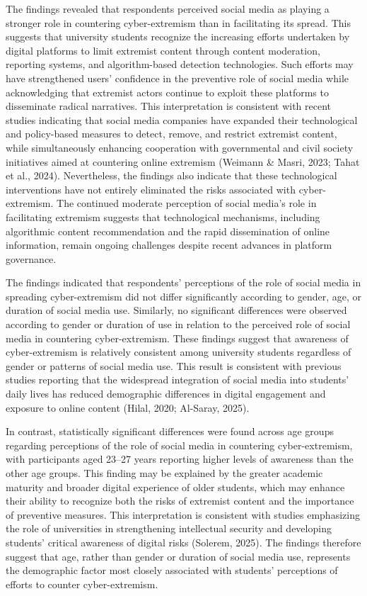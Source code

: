 \documentclass[10pt]{NSP1}
\begin{document}
	The findings revealed that respondents perceived social media as playing a stronger role in countering cyber-extremism than in facilitating its spread. This suggests that university students recognize the increasing efforts undertaken by digital platforms to limit extremist content through content moderation, reporting systems, and algorithm-based detection technologies. Such efforts may have strengthened users' confidence in the preventive role of social media while acknowledging that extremist actors continue to exploit these platforms to disseminate radical narratives. This interpretation is consistent with recent studies indicating that social media companies have expanded their technological and policy-based measures to detect, remove, and restrict extremist content, while simultaneously enhancing cooperation with governmental and civil society initiatives aimed at countering online extremism (Weimann \& Masri, 2023; Tahat et al., 2024). Nevertheless, the findings also indicate that these technological interventions have not entirely eliminated the risks associated with cyber-extremism. The continued moderate perception of social media's role in facilitating extremism suggests that technological mechanisms, including algorithmic content recommendation and the rapid dissemination of online information, remain ongoing challenges despite recent advances in platform governance.
	
	The findings indicated that respondents' perceptions of the role of social media in spreading cyber-extremism did not differ significantly according to gender, age, or duration of social media use. Similarly, no significant differences were observed according to gender or duration of use in relation to the perceived role of social media in countering cyber-extremism. These findings suggest that awareness of cyber-extremism is relatively consistent among university students regardless of gender or patterns of social media use. This result is consistent with previous studies reporting that the widespread integration of social media into students' daily lives has reduced demographic differences in digital engagement and exposure to online content (Hilal, 2020; Al-Saray, 2025).
	
	In contrast, statistically significant differences were found across age groups regarding perceptions of the role of social media in countering cyber-extremism, with participants aged 23–27 years reporting higher levels of awareness than the other age groups. This finding may be explained by the greater academic maturity and broader digital experience of older students, which may enhance their ability to recognize both the risks of extremist content and the importance of preventive measures. This interpretation is consistent with studies emphasizing the role of universities in strengthening intellectual security and developing students' critical awareness of digital risks (Solerem, 2025). The findings therefore suggest that age, rather than gender or duration of social media use, represents the demographic factor most closely associated with students' perceptions of efforts to counter cyber-extremism.
	
\end{document}
